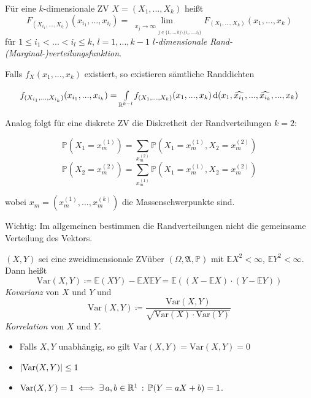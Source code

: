 \documentclass{cheat-sheet}
\newcommand{\Alg}{\mathfrak{A}} %
\renewcommand{\P}{\mathbb{P}}
\newcommand{\E}{\mathbb{E}} %
\newcommand{\Var}{\mathrm{Var}} %
\newcommand{\cov}{\mathrm{Var}} %
\newcommand{\cor}{\mathrm{Var}} %
\begin{document}
\begin{defn}
  Für eine $k$-dimensionale ZV $X = (X_1, ..., X_k)$ heißt
  \[ F_{(X_{i_1}, ..., X_{i_l})}(x_{i_1}, ..., x_{i_l}) = \lim_{\substack{x_j \to \infty}_{j \in \{ 1, ..., k\} \setminus \{ i_1, ..., i_l \}}} F_(X_1, ..., X_k)(x_1, ..., x_k) \]
  für $1 \leq i_1 < ... < i_l \leq k$, $l = 1, ..., k-1$ \emph{$l$-dimensionale Rand-(Marginal-)verteilungsfunktion}.
\end{defn}

Falls $f_X(x_1, ..., x_k)$ existiert, so existieren sämtliche Randdichten

\[ f_{(X_{i_1}, ..., X_{i_k})}(x_{i_1}, ..., x_{i_k}) = {\textstyle \int\limits_{\mathbb{R}^{k-l}}^{}} f_{(X_1, ..., X_k)}(x_1, ..., x_k) \,\mathrm{d} (x_1, \widehat{x_{i_1}}, ..., \widehat{x_{i_k}}, ..., x_k) \]

Analog folgt für eine diskrete ZV die Diskretheit der Randverteilungen $k=2$:

\[ \P(X_1 = x_m^{(1)}) = \sum_{x_m^{(2)}} \P(X_1 = x_m^{(1)}, X_2 = x_m^{(2)}) \]
\[ \P(X_2 = x_m^{(2)}) = \sum_{x_m^{(1)}} \P(X_1 = x_m^{(1)}, X_2 = x_m^{(2)}) \]

wobei $x_m = (x_m^{(1)}, ..., x_m^{(k)})$ die Massenschwerpunkte sind.

Wichtig: Im allgemeinen bestimmen die Randverteilungen nicht die gemeinsame Verteilung des Vektors.



\begin{defn}
  $(X, Y)$ sei eine zweidimensionale ZVüber $(\Omega, \Alg, \P)$ mit $\E X^2 < \infty$, $\E Y^2 < \infty$. Dann heißt
  \[ \cov(X, Y) \coloneqq \E(XY) - \E X \E Y = \E ((X - \E X) \cdot (Y - \E Y)) \]
  \emph{Kovarianz} von $X$ und $Y$ und
  \[ \cor(X, Y) \coloneqq \frac{\cov(X, Y)}{\sqrt{\Var(X) \cdot \Var(Y)}} \]
  \emph{Korrelation} von $X$ und $Y$.
\end{defn}

\begin{satz}
  \begin{itemize}
    \item Falls $X, Y$ unabhängig, so gilt $\cov(X, Y) = \cor(X, Y) = 0$
    \item $\abs{\cor(X, Y)} \leq 1$
    \item $\cor(X, Y) = 1 \iff \exists \, a, b \in \R^1 \,:\, \P(Y = aX + b) = 1$.
  \end{itemize}
\end{satz}
\end{document}
